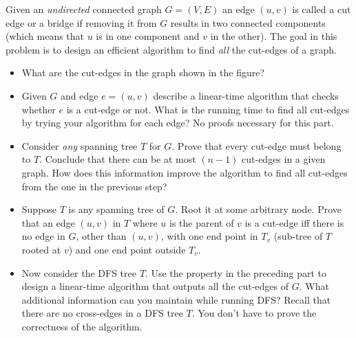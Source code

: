 \documentclass[11pt]{article}
\begin{document}

\item Given an \emph{undirected} connected graph $G=(V,E)$ an edge $(u,v)$ is
  called a cut edge or a bridge if removing it from $G$ results in
  two connected components (which means that $u$ is in one component
  and $v$ in the other). The goal in this problem is to design an efficient
  algorithm to find {\em all} the cut-edges of a graph.

  \begin{itemize}
  \item What are the cut-edges in the graph shown in the figure?
     
  \item Given $G$ and edge $e=(u,v)$ describe a linear-time algorithm
    that checks whether $e$ is a cut-edge or not. What is the running time
    to find all cut-edges by trying your algorithm for each edge? No proofs
    necessary for this part.
  \item Consider {\em any} spanning tree $T$ for $G$. Prove that every
    cut-edge must belong to $T$. Conclude that there can be at most $(n-1)$
    cut-edges in a given graph. How does this information improve the
    algorithm to find all cut-edges from the one in the previous step?
  \item Suppose $T$ is any spanning tree of $G$. Root it at some
    arbitrary node.  Prove that an edge $(u,v)$ in $T$ where $u$ is
    the parent of $v$ is a cut-edge iff there is no edge in $G$, other
    than $(u,v)$, with one end point in $T_v$ (sub-tree of $T$ rooted
    at $v$) and one end point outside $T_v$.
  \item Now consider the DFS tree $T$.  Use the property in the
    preceding part to design a linear-time algorithm that outputs all
    the cut-edges of $G$. What additional information can you maintain
    while running DFS? Recall that there are no cross-edges in a DFS
    tree $T$. You don't have to prove the correctness of
    the algorithm.
  \end{itemize}
\end{document}
